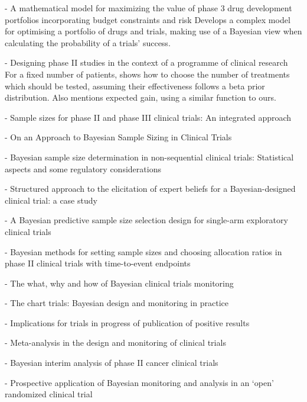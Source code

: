 \documentclass{article} %
\begin{document}
\cite{Patel2013} - A mathematical model for maximizing the value of phase 3 drug development portfolios incorporating budget constraints and risk
Develops a complex model for optimising a portfolio of drugs and trials, making use of a Bayesian view when calculating the probability of a trials' success.

\cite{Whitehead1985} - Designing phase II studies in the context of a programme of clinical research
For a fixed number of patients, shows how to choose the number of treatments which should be tested, assuming their effectiveness follows a beta prior distribution. Also mentions expected gain, using a similar function to ours.

\cite{Whitehead1986} - Sample sizes for phase II and phase III clinical trials: An integrated approach

\cite{Muirhead2013} - On an Approach to Bayesian Sample Sizing in Clinical Trials

\cite{Grouin2007} - Bayesian sample size determination in non-sequential clinical trials: Statistical aspects and some regulatory considerations

\cite{Kinnersley2013} - Structured approach to the elicitation of expert beliefs for a Bayesian-designed clinical trial: a case study

\cite{Teramukai2012} - A Bayesian predictive sample size selection design for single-arm exploratory clinical trials

\cite{Cotterill2015} - Bayesian methods for setting sample sizes and choosing allocation ratios in phase II clinical trials with time-to-event endpoints




\cite{Freedman1994} - The what, why and how of Bayesian clinical trials monitoring

\cite{Parmar1994} - The chart trials: Bayesian design and monitoring in practice

\cite{Fletcher1993} - Implications for trials in progress of publication of positive results

\cite{DERSIMONIAN1996} - Meta-analysis in the design and monitoring of clinical trials

\cite{Heitjan1997} - Bayesian interim analysis of phase II cancer clinical trials

\cite{Vail2001} - Prospective application of Bayesian monitoring and analysis in an `open' randomized clinical trial
\end{document}
